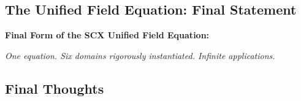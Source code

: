 \documentclass[12pt,a4paper]{article}
\theoremstyle{plain}
\theoremstyle{definition}
\newcommand{\curv}{F}
\newcommand{\conn}{\omega}
\newcommand{\ClaimSpace}{\mathfrak{C}}
\DeclareMathOperator{\Tr}{Tr}
\DeclareMathOperator{\Hol}{Hol}
\begin{document}
\subsection{The Unified Field Equation: Final Statement}

\begin{keyeq}
\textbf{Final Form of the SCX Unified Field Equation:}

\begin{center}
\end{center}

\textit{One equation. Six domains rigorously instantiated. Infinite applications.}
\end{keyeq}

\subsection{Final Thoughts}
\end{document}
